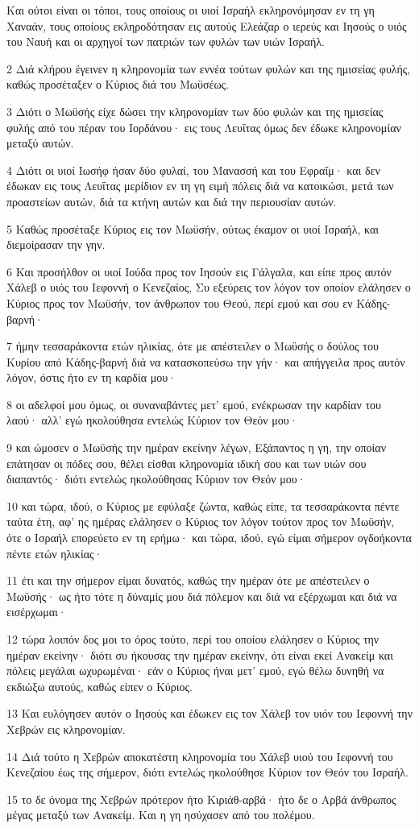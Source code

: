 \par Και ούτοι είναι οι τόποι, τους οποίους οι υιοί Ισραήλ εκληρονόμησαν εν τη γη Χαναάν, τους οποίους εκληροδότησαν εις αυτούς Ελεάζαρ ο ιερεύς και Ιησούς ο υιός του Ναυή και οι αρχηγοί των πατριών των φυλών των υιών Ισραήλ.
\par 2 Διά κλήρου έγεινεν η κληρονομία των εννέα τούτων φυλών και της ημισείας φυλής, καθώς προσέταξεν ο Κύριος διά του Μωϋσέως.
\par 3 Διότι ο Μωϋσής είχε δώσει την κληρονομίαν των δύο φυλών και της ημισείας φυλής από του πέραν του Ιορδάνου· εις τους Λευΐτας όμως δεν έδωκε κληρονομίαν μεταξύ αυτών.
\par 4 Διότι οι υιοί Ιωσήφ ήσαν δύο φυλαί, του Μανασσή και του Εφραΐμ· και δεν έδωκαν εις τους Λευΐτας μερίδιον εν τη γη ειμή πόλεις διά να κατοικώσι, μετά των προαστείων αυτών, διά τα κτήνη αυτών και διά την περιουσίαν αυτών.
\par 5 Καθώς προσέταξε Κύριος εις τον Μωϋσήν, ούτως έκαμον οι υιοί Ισραήλ, και διεμοίρασαν την γην.
\par 6 Και προσήλθον οι υιοί Ιούδα προς τον Ιησούν εις Γάλγαλα, και είπε προς αυτόν Χάλεβ ο υιός του Ιεφοννή ο Κενεζαίος, Συ εξεύρεις τον λόγον τον οποίον ελάλησεν ο Κύριος προς τον Μωϋσήν, τον άνθρωπον του Θεού, περί εμού και σου εν Κάδης-βαρνή·
\par 7 ήμην τεσσαράκοντα ετών ηλικίας, ότε με απέστειλεν ο Μωϋσής ο δούλος του Κυρίου από Κάδης-βαρνή διά να κατασκοπεύσω την γήν· και απήγγειλα προς αυτόν λόγον, όστις ήτο εν τη καρδία μου·
\par 8 οι αδελφοί μου όμως, οι συναναβάντες μετ' εμού, ενέκρωσαν την καρδίαν του λαού· αλλ' εγώ ηκολούθησα εντελώς Κύριον τον Θεόν μου·
\par 9 και ώμοσεν ο Μωϋσής την ημέραν εκείνην λέγων, Εξάπαντος η γη, την οποίαν επάτησαν οι πόδες σου, θέλει είσθαι κληρονομία ιδική σου και των υιών σου διαπαντός· διότι εντελώς ηκολούθησας Κύριον τον Θεόν μου·
\par 10 και τώρα, ιδού, ο Κύριος με εφύλαξε ζώντα, καθώς είπε, τα τεσσαράκοντα πέντε ταύτα έτη, αφ' ης ημέρας ελάλησεν ο Κύριος τον λόγον τούτον προς τον Μωϋσήν, ότε ο Ισραήλ επορεύετο εν τη ερήμω· και τώρα, ιδού, εγώ είμαι σήμερον ογδοήκοντα πέντε ετών ηλικίας·
\par 11 έτι και την σήμερον είμαι δυνατός, καθώς την ημέραν ότε με απέστειλεν ο Μωϋσής· ως ήτο τότε η δύναμίς μου διά πόλεμον και διά να εξέρχωμαι και διά να εισέρχωμαι·
\par 12 τώρα λοιπόν δος μοι το όρος τούτο, περί του οποίου ελάλησεν ο Κύριος την ημέραν εκείνην· διότι συ ήκουσας την ημέραν εκείνην, ότι είναι εκεί Ανακείμ και πόλεις μεγάλαι ωχυρωμέναι· εάν ο Κύριος ήναι μετ' εμού, εγώ θέλω δυνηθή να εκδιώξω αυτούς, καθώς είπεν ο Κύριος.
\par 13 Και ευλόγησεν αυτόν ο Ιησούς και έδωκεν εις τον Χάλεβ τον υιόν του Ιεφοννή την Χεβρών εις κληρονομίαν.
\par 14 Διά τούτο η Χεβρών αποκατέστη κληρονομία του Χάλεβ υιού του Ιεφοννή του Κενεζαίου έως της σήμερον, διότι εντελώς ηκολούθησε Κύριον τον Θεόν του Ισραήλ.
\par 15 το δε όνομα της Χεβρών πρότερον ήτο Κιριάθ-αρβά· ήτο δε ο Αρβά άνθρωπος μέγας μεταξύ των Ανακείμ. Και η γη ησύχασεν από του πολέμου.

